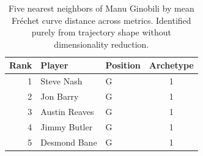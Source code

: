\begin{table}[htbp]
  \centering\small
  \begin{tabular}{rllc}
    \toprule
    Rank & Player & Position & Archetype \\
    \midrule
    1 & Steve Nash & G & 1 \\
    2 & Jon Barry & G & 1 \\
    3 & Austin Reaves & G & 1 \\
    4 & Jimmy Butler & G & 1 \\
    5 & Desmond Bane & G & 1 \\
    \bottomrule
  \end{tabular}
  \caption{Five nearest neighbors of Manu Ginobili by mean Fr\'{e}chet curve distance across metrics. Identified purely from trajectory shape without dimensionality reduction.}
  \label{tab:Manu_Ginobili_frechet_curve_neighbors}
\end{table}

